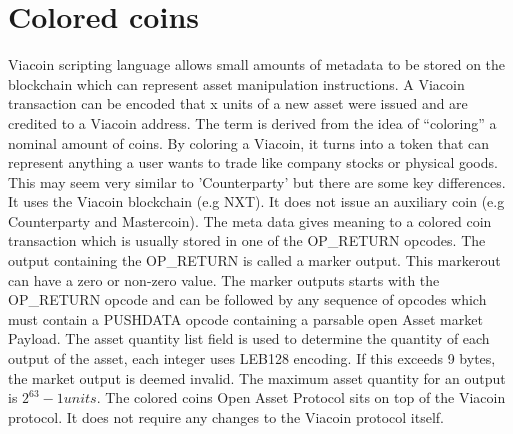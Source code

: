 \documentclass{article}
\begin{document}
\section{Colored coins}\label{Colored coins}
Viacoin scripting language allows small amounts of metadata to be stored on the
blockchain which can represent asset manipulation instructions. A Viacoin
transaction can be encoded that x units of a new asset were issued and are
credited to a Viacoin address. The term is derived from the idea of “coloring” a
nominal amount of coins.
By coloring a Viacoin, it turns into a token that can represent anything a user
wants to trade like company stocks or physical goods. This may seem very similar to
'Counterparty' but there are some key differences. It uses the Viacoin blockchain
(e.g NXT).
\newline \newline \noindent
It does not issue an auxiliary coin (e.g Counterparty and Mastercoin).
The meta data gives meaning to a \cite{coloredCoins}colored coin transaction which is usually stored
in one of the OP\_RETURN opcodes. The output containing the OP\_RETURN is called
a marker output. This markerout can have a zero or non-zero value. The marker
outputs starts with the OP\_RETURN opcode and can be followed by any sequence
of opcodes which must contain a PUSHDATA opcode containing a parsable open
Asset market Payload.
The asset quantity list field is used to determine the quantity of each output of
the asset, each integer uses LEB128 encoding. If this exceeds 9 bytes, the
market output is deemed invalid. The maximum asset quantity for an output is
$2^63 - 1 units$.
The colored coins \cite{openAsset}Open Asset Protocol sits on top of the Viacoin protocol. It does
not require any changes to the Viacoin protocol itself.
\end{document}
